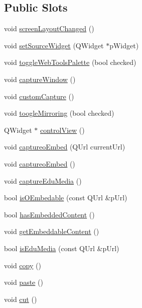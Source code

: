 \subsection*{Public Slots}
\begin{DoxyCompactItemize}
\item 
void \hyperlink{class_u_b_web_controller_a3f864bc3cd2c4aee88a13438af932cb4}{screen\-Layout\-Changed} ()
\item 
void \hyperlink{class_u_b_web_controller_af341fd41ab6358908169c19a0f170612}{set\-Source\-Widget} (Q\-Widget $\ast$p\-Widget)
\item 
void \hyperlink{class_u_b_web_controller_a6f1deea626abae749e35fe27b6bce89e}{toggle\-Web\-Tools\-Palette} (bool checked)
\item 
void \hyperlink{class_u_b_web_controller_a72bce2bc4114781c04616264f50beb16}{capture\-Window} ()
\item 
void \hyperlink{class_u_b_web_controller_a9064dd8d6030e3ca52233b36acbfa66a}{custom\-Capture} ()
\item 
void \hyperlink{class_u_b_web_controller_a3bd0afac31c8ed2a086d486b0bfccaae}{toogle\-Mirroring} (bool checked)
\item 
Q\-Widget $\ast$ \hyperlink{class_u_b_web_controller_aafaa8730d1d4023af55a9837250bcedb}{control\-View} ()
\item 
void \hyperlink{class_u_b_web_controller_ae652b7467df50b60c8d074d94abf698b}{captureo\-Embed} (Q\-Url current\-Url)
\item 
void \hyperlink{class_u_b_web_controller_ab01d65c61d0fa0b56a1c9eedf5ca003c}{captureo\-Embed} ()
\item 
void \hyperlink{class_u_b_web_controller_a318422dc0a027e2258180673bb333586}{capture\-Edu\-Media} ()
\item 
bool \hyperlink{class_u_b_web_controller_a03cf8fcfbf3d649a8c2d6da6fb458f76}{is\-O\-Embedable} (const Q\-Url \&p\-Url)
\item 
bool \hyperlink{class_u_b_web_controller_a0d0c024089976ee3e902a8cfcccb3830}{has\-Embedded\-Content} ()
\item 
void \hyperlink{class_u_b_web_controller_a1c8434e762c4a189f940abc0bb5c45db}{get\-Embeddable\-Content} ()
\item 
bool \hyperlink{class_u_b_web_controller_a04a42e97b824dedcb99586807d51e764}{is\-Edu\-Media} (const Q\-Url \&p\-Url)
\item 
void \hyperlink{class_u_b_web_controller_a2d41b47ad1f5f7087c8d999264045d34}{copy} ()
\item 
void \hyperlink{class_u_b_web_controller_a045d48e2127cced12bae99f8256da0d6}{paste} ()
\item 
void \hyperlink{class_u_b_web_controller_a03c0d59c48f4a1850c3a0e7b5753965a}{cut} ()
\end{DoxyCompactItemize}
